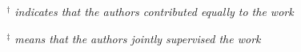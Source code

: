 

%
%
%

{\small 
\noindent \emph{~$^{\textbf{$\dag $}}$ indicates that the authors contributed equally to the work}

\noindent \emph{~$^{\textbf{$\ddag $}}$ means that the authors jointly supervised the work}
}

\vspace{0.4cm}


